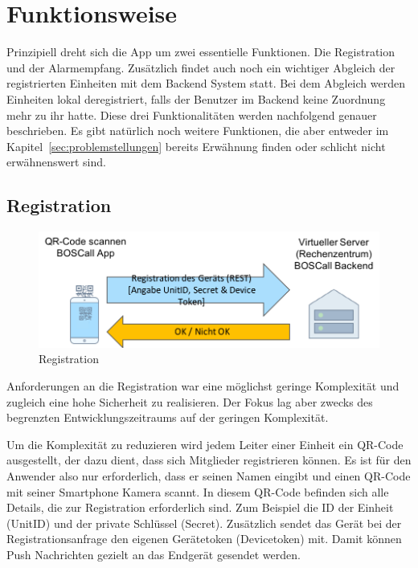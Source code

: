 \section{Funktionsweise}
\label{sec:funktionsweise}
Prinzipiell dreht sich die App um zwei essentielle Funktionen. Die Registration und der Alarmempfang. Zusätzlich findet auch noch ein wichtiger Abgleich der registrierten Einheiten mit dem Backend System statt. Bei dem Abgleich werden Einheiten lokal deregistriert, falls der Benutzer im Backend keine Zuordnung mehr zu ihr hatte. Diese drei Funktionalitäten werden nachfolgend genauer beschrieben. Es gibt natürlich noch weitere Funktionen, die aber entweder im Kapitel~\ref{sec:problemstellungen} bereits Erwähnung finden oder schlicht nicht erwähnenswert sind.
\subsection{Registration}
\begin{figure}[H]
	\centering
	\includegraphics[width=\linewidth]{include/img/registration}
	\caption{Registration}
	\label{fig:registration}
\end{figure}
Anforderungen an die Registration war eine möglichst geringe Komplexität und zugleich eine hohe Sicherheit zu realisieren. Der Fokus lag aber zwecks des begrenzten Entwicklungszeitraums auf der geringen Komplexität.

Um die Komplexität zu reduzieren wird jedem Leiter einer Einheit ein QR-Code ausgestellt, der dazu dient, dass sich Mitglieder registrieren können. Es ist für den Anwender also nur erforderlich, dass er seinen Namen eingibt und einen QR-Code mit seiner Smartphone Kamera scannt. In diesem QR-Code befinden sich alle Details, die zur Registration erforderlich sind. Zum Beispiel die ID der Einheit (UnitID) und der private Schlüssel (Secret). Zusätzlich sendet das Gerät bei der Registrationsanfrage den eigenen Gerätetoken (Devicetoken) mit. Damit können Push Nachrichten gezielt an das Endgerät gesendet werden.

